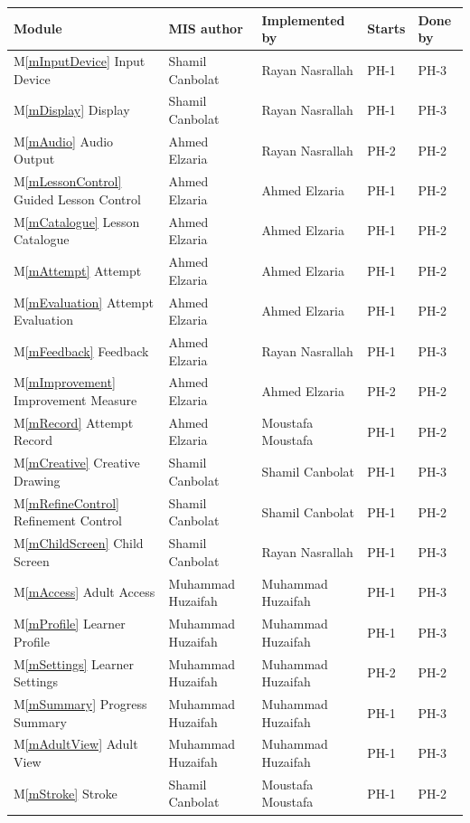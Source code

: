 \documentclass[12pt, titlepage]{article}
\newcommand{\mref}[1]{M\ref{#1}}
\begin{document}
\begin{table}[H]
\centering
\small
\begin{tabular}{@{}p{} l l l l@{}}
\toprule
\textbf{Module} & \textbf{MIS author} & \textbf{Implemented by} &
\textbf{Starts} & \textbf{Done by}\\
\midrule
\mref{mInputDevice} Input Device &
  Shamil Canbolat & Rayan Nasrallah & PH-1 & PH-3\\
\mref{mDisplay} Display & Shamil Canbolat & Rayan Nasrallah & PH-1 & PH-3\\
\mref{mAudio} Audio Output & Ahmed Elzaria & Rayan Nasrallah & PH-2 & PH-2\\
\mref{mLessonControl} Guided Lesson Control &
  Ahmed Elzaria & Ahmed Elzaria & PH-1 & PH-2\\
\mref{mCatalogue} Lesson Catalogue &
  Ahmed Elzaria & Ahmed Elzaria & PH-1 & PH-2\\
\mref{mAttempt} Attempt & Ahmed Elzaria & Ahmed Elzaria & PH-1 & PH-2\\
\mref{mEvaluation} Attempt Evaluation &
  Ahmed Elzaria & Ahmed Elzaria & PH-1 & PH-2\\
\mref{mFeedback} Feedback & Ahmed Elzaria & Rayan Nasrallah & PH-1 & PH-3\\
\mref{mImprovement} Improvement Measure &
  Ahmed Elzaria & Ahmed Elzaria & PH-2 & PH-2\\
\mref{mRecord} Attempt Record &
  Ahmed Elzaria & Moustafa Moustafa & PH-1 & PH-2\\
\mref{mCreative} Creative Drawing &
  Shamil Canbolat & Shamil Canbolat & PH-1 & PH-3\\
\mref{mRefineControl} Refinement Control &
  Shamil Canbolat & Shamil Canbolat & PH-1 & PH-2\\
\mref{mChildScreen} Child Screen &
  Shamil Canbolat & Rayan Nasrallah & PH-1 & PH-3\\
\mref{mAccess} Adult Access &
  Muhammad Huzaifah & Muhammad Huzaifah & PH-1 & PH-3\\
\mref{mProfile} Learner Profile &
  Muhammad Huzaifah & Muhammad Huzaifah & PH-1 & PH-3\\
\mref{mSettings} Learner Settings &
  Muhammad Huzaifah & Muhammad Huzaifah & PH-2 & PH-2\\
\mref{mSummary} Progress Summary &
  Muhammad Huzaifah & Muhammad Huzaifah & PH-1 & PH-3\\
\mref{mAdultView} Adult View &
  Muhammad Huzaifah & Muhammad Huzaifah & PH-1 & PH-3\\
\mref{mStroke} Stroke & Shamil Canbolat & Moustafa Moustafa & PH-1 & PH-2\\

\end{tabular}
\end{table}
\end{document}
